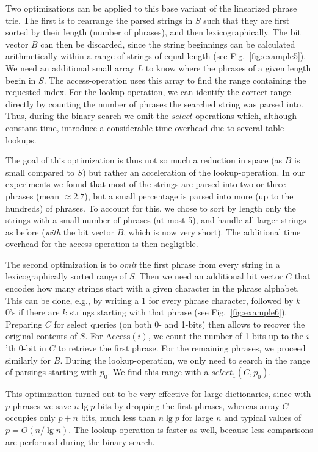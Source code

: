 \documentclass{llncs}
\newcommand{\access}{\ensuremath{\text{Access}}}
\newcommand{\select}{\ensuremath{\textit{select}}}
\begin{document}
Two optimizations can be applied to this base variant of the linearized phrase trie. The first is to rearrange the parsed strings in $S$ such that they are first sorted by their length (number of phrases), and then lexicographically. The bit vector $B$ can then be discarded, since the string beginnings can be calculated arithmetically within a range of strings of equal length (see Fig.~\ref{fig:example5}). We need an additional small array $L$ to know where the phrases of a given length begin in $S$. The access-operation uses this array to find the range containing the requested index. For the lookup-operation, we can identify the correct range directly by counting the number of phrases the searched string was parsed into. Thus, during the binary search we omit the $\select$-operations which, although constant-time, introduce a considerable time overhead due to several table lookups.

The goal of this optimization is thus not so much a reduction in space (as $B$ is small compared to $S$) but rather an acceleration of the lookup-operation. In our experiments we found that most of the strings are parsed into two or three phrases (mean $\approx 2.7$), but a small percentage is parsed into more (up to the hundreds) of phrases. To account for this, we chose to sort by length only the strings with a small number of phrases (at most 5), and handle all larger strings as before (\emph{with} the bit vector $B$, which is now very short). The additional time overhead for the access-operation is then negligible.

The second optimization is to \emph{omit} the first phrase from every string in a lexicographically sorted range of $S$. Then we need an additional bit vector $C$ that encodes how many strings start with a given character in the phrase alphabet. This can be done, e.g., by writing a 1 for every phrase character, followed by $k$ 0's if there are $k$ strings starting with that phrase (see Fig.~\ref{fig:example6}). Preparing $C$ for select queries (on both 0- and 1-bits) then allows to recover the original contents of $S$. For $\access(i)$, we count the number of 1-bits up to the $i$'th 0-bit in $C$ to retrieve the first phrase. For the remaining phrases, we proceed similarly for $B$. During the lookup-operation, we only need to search in the range of parsings starting with $p_0$. We find this range with a $\select_1(C, p_0)$. 

This optimization turned out to be very effective for large dictionaries, since with $p$ phrases we save $n\lg p$ bits by dropping the first phrases, whereas array $C$ occupies only $p+n$ bits, much less than $n\lg p$ for large $n$ and typical values of $p=O(n/\lg n)$. The lookup-operation is faster as well, because less comparisons are performed during the binary search.
\end{document}
